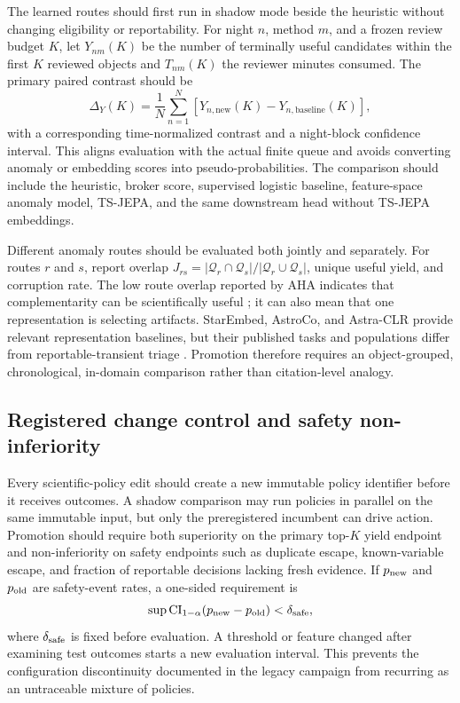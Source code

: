 \documentclass[11pt]{article}
\begin{document}
The learned routes should first run in shadow mode beside the heuristic without changing eligibility or reportability. For night $n$, method $m$, and a frozen review budget $K$, let $Y_{nm}(K)$ be the number of terminally useful candidates within the first $K$ reviewed objects and $T_{nm}(K)$ the reviewer minutes consumed. The primary paired contrast should be
\begin{equation}
  \Delta_Y(K)=\frac{1}{N}\sum_{n=1}^{N}
  \left[Y_{n,\mathrm{new}}(K)-Y_{n,\mathrm{baseline}}(K)\right],
\label{eq:paired-topk}
\end{equation}
with a corresponding time-normalized contrast and a night-block confidence interval. This aligns evaluation with the actual finite queue and avoids converting anomaly or embedding scores into pseudo-probabilities. The comparison should include the heuristic, broker score, supervised logistic baseline, feature-space anomaly model, TS-JEPA, and the same downstream head without TS-JEPA embeddings.

Different anomaly routes should be evaluated both jointly and separately. For routes $r$ and $s$, report overlap $J_{rs}=|\mathcal{Q}_r\cap\mathcal{Q}_s|/|\mathcal{Q}_r\cup\mathcal{Q}_s|$, unique useful yield, and corruption rate. The low route overlap reported by AHA indicates that complementarity can be scientifically useful \citep{iskandarli2026}; it can also mean that one representation is selecting artifacts. StarEmbed, AstroCo, and Astra-CLR provide relevant representation baselines, but their published tasks and populations differ from reportable-transient triage \citep{li2026,tan2025,majumder2026}. Promotion therefore requires an object-grouped, chronological, in-domain comparison rather than citation-level analogy.

\subsection{Registered change control and safety non-inferiority}

Every scientific-policy edit should create a new immutable policy identifier before it receives outcomes. A shadow comparison may run policies in parallel on the same immutable input, but only the preregistered incumbent can drive action. Promotion should require both superiority on the primary top-$K$ yield endpoint and non-inferiority on safety endpoints such as duplicate escape, known-variable escape, and fraction of reportable decisions lacking fresh evidence. If $p_{\rm new}$ and $p_{\rm old}$ are safety-event rates, a one-sided requirement is
\begin{equation}
  \sup \mathrm{CI}_{1-\alpha}\!\left(p_{\rm new}-p_{\rm old}\right)<\delta_{\rm safe},
\label{eq:safety-noninferiority}
\end{equation}
where $\delta_{\rm safe}$ is fixed before evaluation. A threshold or feature changed after examining test outcomes starts a new evaluation interval. This prevents the configuration discontinuity documented in the legacy campaign from recurring as an untraceable mixture of policies.
\end{document}
